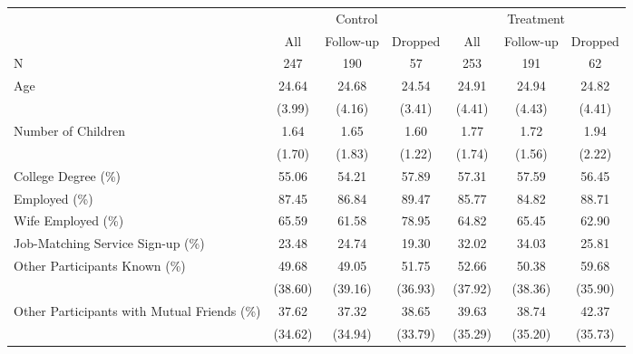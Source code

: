 \def\sym#1{\ifmmode^{#1}\else\(^{#1}\)\fi}
\begin{tabular}{@{\extracolsep{0.1cm}}l*{6}{c}} \toprule
& \multicolumn{3}{c}{Control} & \multicolumn{3}{c}{Treatment} \\ \cmidrule{2-4} \cmidrule{5-7}
& All & Follow-up & Dropped & All & Follow-up & Dropped \\
\midrule
N  & 247 & 190 & 57 & 253 & 191 & 62 \\
\midrule
Age & 24.64 & 24.68 & 24.54 & 24.91 & 24.94 & 24.82 \\
 & (3.99) & (4.16) & (3.41) & (4.41) & (4.43) & (4.41) \\
Number of Children & 1.64 & 1.65 & 1.60 & 1.77 & 1.72 & 1.94 \\
 & (1.70) & (1.83) & (1.22) & (1.74) & (1.56) & (2.22) \\
College Degree (\%) & 55.06 & 54.21 & 57.89 & 57.31 & 57.59 & 56.45 \\
Employed (\%) & 87.45 & 86.84 & 89.47 & 85.77 & 84.82 & 88.71 \\
Wife Employed (\%) & 65.59 & 61.58 & 78.95 & 64.82 & 65.45 & 62.90 \\
Job-Matching Service Sign-up (\%) & 23.48 & 24.74 & 19.30 & 32.02 & 34.03 & 25.81 \\
Other Participants Known (\%) & 49.68 & 49.05 & 51.75 & 52.66 & 50.38 & 59.68 \\
 & (38.60) & (39.16) & (36.93) & (37.92) & (38.36) & (35.90) \\
Other Participants with Mutual Friends (\%) & 37.62 & 37.32 & 38.65 & 39.63 & 38.74 & 42.37 \\
 & (34.62) & (34.94) & (33.79) & (35.29) & (35.20) & (35.73) \\
\bottomrule
\end{tabular}
